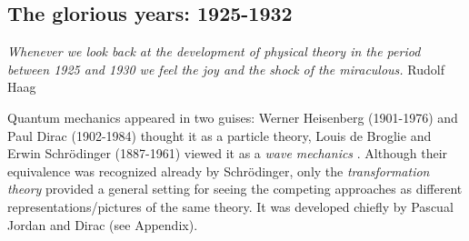 \smallskip

\subsection{The glorious years: 1925-1932}

\begin{flushright}
{\it Whenever we look back at the development of physical theory
                      in the period between 1925 and 1930
          we feel the joy and the shock of the miraculous.}
                                               Rudolf Haag

\end{flushright}

Quantum mechanics appeared in two guises: Werner Heisenberg (1901-1976) and
Paul Dirac (1902-1984) thought it as a particle theory, Louis de Broglie and
Erwin Schr\"odinger (1887-1961) viewed it as a {\it wave mechanics} \cite{Sch}.
 Although their equivalence was recognized already by Schr\"odinger, only the
{\it transformation theory} provided a general setting for seeing the competing
approaches as different representations/pictures of the same theory. It was
developed chiefly by Pascual Jordan and Dirac (see Appendix).

